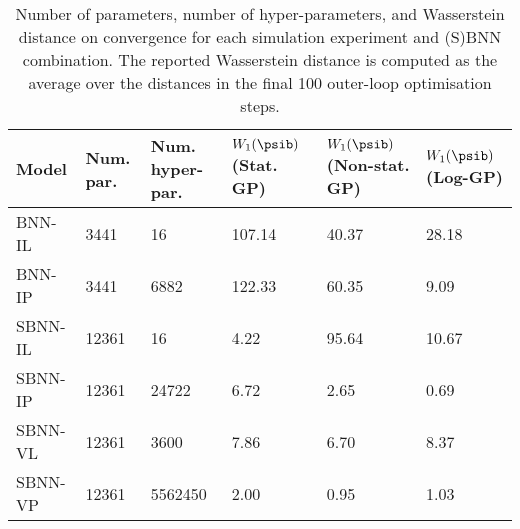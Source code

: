 \begin{table}[!t]
\centering
\caption{Number of parameters, number of hyper-parameters, and Wasserstein distance on convergence for each simulation experiment and (S)BNN combination. The reported Wasserstein distance is computed as the average over the distances in the final 100 outer-loop optimisation steps. \label{tab:results}} 
\begin{tabular}{lp{1.5cm}p{1.75cm}p{1.85cm}p{2.6cm}p{1.75cm}}
  \hline
Model & Num. par. & Num. hyper-par. & $W_1(\psib)$ (Stat. GP) & $W_1(\psib)$ \newline (Non-stat. GP) & $W_1(\psib)$ (Log-GP) \\ 
  \hline
BNN-IL & 3441 & 16 & 107.14 & 40.37 & 28.18 \\ 
  BNN-IP & 3441 & 6882 & 122.33 & 60.35 & 9.09 \\ 
  SBNN-IL & 12361 & 16 & 4.22 & 95.64 & 10.67 \\ 
  SBNN-IP & 12361 & 24722 & 6.72 & 2.65 & 0.69 \\ 
  SBNN-VL & 12361 & 3600 & 7.86 & 6.70 & 8.37 \\ 
  SBNN-VP & 12361 & 5562450 & 2.00 & 0.95 & 1.03 \\ 
   \hline
\end{tabular}
\end{table}

